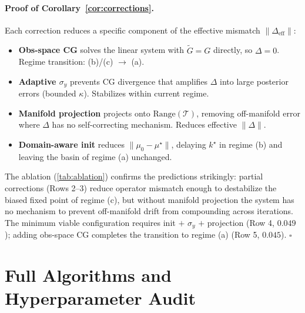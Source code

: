 \documentclass{article}
\theoremstyle{plain}
\theoremstyle{definition}
\theoremstyle{remark}
\newcommand{\tsimg}{\mathcal{T}}
\begin{document}
\paragraph{Proof of Corollary~\ref{cor:corrections}.}
Each correction reduces a specific component of the effective mismatch $\|\Delta_{\mathrm{eff}}\|$:
\begin{itemize}
\setlength{\itemsep}{0pt}
\item \textbf{Obs-space CG} solves the linear system with $\tilde{G} = G$ directly, so $\Delta = 0$. Regime transition: (b)/(c) $\to$ (a).
\item \textbf{Adaptive $\sigma_y$} prevents CG divergence that amplifies $\Delta$ into large posterior errors (bounded $\kappa$). Stabilizes within current regime.
\item \textbf{Manifold projection} projects onto $\mathrm{Range}(\tsimg)$, removing off-manifold error where $\Delta$ has no self-correcting mechanism. Reduces effective $\|\Delta\|$.
\item \textbf{Domain-aware init} reduces $\|\mu_0 - \mu^\star\|$, delaying $k^\star$ in regime (b) and leaving the basin of regime (a) unchanged.
\end{itemize}
The ablation (\cref{tab:ablation}) confirms the predictions strikingly: partial corrections (Rows 2--3) reduce operator mismatch enough to destabilize the biased fixed point of regime (c), but without manifold projection the system has no mechanism to prevent off-manifold drift from compounding across iterations. The minimum viable configuration requires init $+$ $\sigma_y$ $+$ projection (Row 4, $0.049$); adding obs-space CG completes the transition to regime (a) (Row 5, $0.045$). $\square$

\section{Full Algorithms and Hyperparameter Audit}
\label{app:algorithms}
\end{document}
